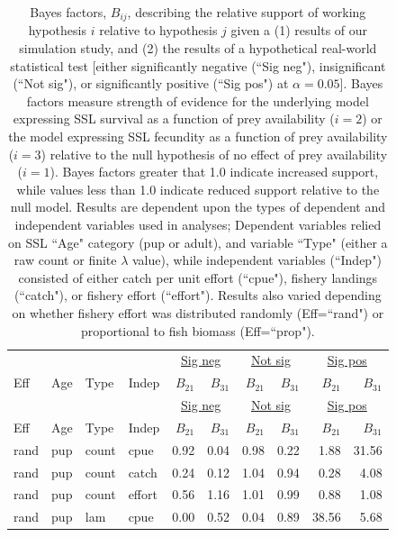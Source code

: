 \documentclass[11pt]{article}
\begin{document}
\begin{longtable}{llllrrrrrr}
\caption[BF]{\large Bayes factors, $B_{ij}$, describing the relative support of working hypothesis $i$ relative to hypothesis $j$ given a (1) results of our simulation study, and (2) the results of a hypothetical real-world statistical test [either significantly negative (``Sig neg"), insignificant (``Not sig"), or significantly positive (``Sig pos") at $\alpha=0.05$]. Bayes factors measure strength of evidence for the underlying model expressing SSL survival as a function of prey availability ($i=2$) or the model expressing SSL fecundity as a function of prey availability ($i=3$) relative to the null hypothesis of no effect of prey availability ($i=1$).  Bayes factors greater that 1.0 indicate increased support, while values less than 1.0 indicate reduced support relative to the null model.  Results are dependent upon the types of dependent and independent variables used in analyses; Dependent variables relied on SSL ``Age" category (pup or adult), and variable ``Type" (either a raw count or finite $\lambda$ value), while independent variables (``Indep") consisted of either catch per unit effort (``cpue"), fishery landings (``catch"), or fishery effort (``effort").  Results also varied depending on whether fishery effort was distributed randomly (Eff=``rand") or proportional to fish biomass (Eff=``prop").}
\label{tab:BF} \\
\hline \hline
    & & & & \multicolumn{2}{c}{\underline{Sig neg}} & \multicolumn{2}{c}{\underline{Not sig}} & \multicolumn{2}{c}{\underline{Sig pos}} \\
Eff & Age & Type & Indep & $B_{21}$ & $B_{31}$ & $B_{21}$ & $B_{31}$ & $B_{21}$ & $B_{31}$ \\
  \hline
\endfirsthead
\hline \hline
     & & & & \multicolumn{2}{c}{\underline{Sig neg}} & \multicolumn{2}{c}{\underline{Not sig}} & \multicolumn{2}{c}{\underline{Sig pos}} \\
Eff & Age & Type & Indep & $B_{21}$ & $B_{31}$ & $B_{21}$ & $B_{31}$ & $B_{21}$ & $B_{31}$ \\
  \hline
\endhead
\hline
\endfoot
\hline
\endlastfoot
rand & pup & count & cpue & 0.92 & 0.04 & 0.98 & 0.22 & 1.88 & 31.56 \\
  rand & pup & count & catch & 0.24 & 0.12 & 1.04 & 0.94 & 0.28 & 4.08 \\
  rand & pup & count & effort & 0.56 & 1.16 & 1.01 & 0.99 & 0.88 & 1.08 \\
  rand & pup & lam & cpue & 0.00 & 0.52 & 0.04 & 0.89 & 38.56 & 5.68 \\

\end{longtable}
\end{document}
